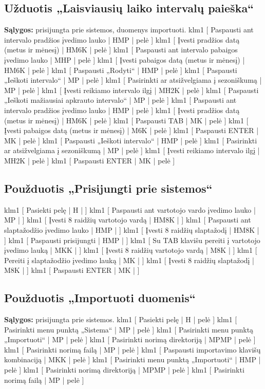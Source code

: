 \subsection{Užduotis „Laisviausių laiko intervalų paieška“}
\textbf{Sąlygos:} prisijungta prie sistemos, duomenys importuoti.
\klm
{
  klm1 [ Paspausti ant intervalo pradžios įvedimo lauko | HMP | pelė ]
  klm1 [ Įvesti pradžios datą (metus ir mėnesį) | HM6K | pelė ]
  klm1 [ Paspausti ant intervalo pabaigos įvedimo lauko | MHP | pelė ]
  klm1 [ Įvesti pabaigos datą (metus ir mėnesį) | HM6K | pelė ]
  klm1 [ Paspausti „Rodyti“ | HMP | pelė ]
  klm1 [ Paspausti „Ieškoti intervalo“ | MP | pelė ]
  klm1 [ Pasirinkti ar atsižvelgiama į sezoniškumą | MP | pelė ]
  klm1 [ Įvesti reikiamo intervalo ilgį | MH2K | pelė ]
  klm1 [ Paspausti „Ieškoti mažiausiai apkrauto intervalo“ | MP | pelė ]
}
{
  klm1 [ Paspausti ant intervalo pradžios įvedimo lauko | HMP | pelė ]
  klm1 [ Įvesti pradžios datą (metus ir mėnesį) | HM6K | pelė ]
  klm1 [ Paspausti TAB | MK | pelė ]
  klm1 [ Įvesti pabaigos datą (metus ir mėnesį) | M6K | pelė ]
  klm1 [ Paspausti ENTER | MK | pelė ]
  klm1 [ Paspausti „Ieškoti intervalo“ | HMP | pelė ]
  klm1 [ Pasirinkti ar atsižvelgiama į sezoniškumą | MP | pelė ]
  klm1 [ Įvesti reikiamo intervalo ilgį | MH2K | pelė ]
  klm1 [ Paspausti ENTER | MK | pelė ]
}

\subsection{Použduotis „Prisijungti prie sistemos“}
\klm
{
  klm1 [ Pasiekti pelę | H | ]
  klm1 [ Paspausti ant vartotojo vardo įvedimo lauko | MP | ]
  klm1 [ Įvesti 8 raidžių vartotojo vardą | HM8K | ]
  klm1 [ Paspausti ant slaptažodžio įvedimo lauko | HMP | ]
  klm1 [ Įvesti 8 raidžių slaptažodį | HM8K | ]
  klm1 [ Paspausti prisijungti | HMP | ]
}
{
  klm1 [ Su TAB klavišu pereiti į vartotojo įvedimo lauką | MKK | ]
  klm1 [ Įvesti 8 raidžių vartotojo vardą | M8K | ]
  klm1 [ Pereiti į slaptažodžio įvedimo lauką | MK | ]
  klm1 [ Įvesti 8 raidžių slaptažodį | M8K | ]
  klm1 [ Paspausti ENTER | MK | ]
}

\subsection{Použduotis „Importuoti duomenis“}
\textbf{Sąlygos:} prisijungta prie sistemos.
\klm
{
  klm1 [ Pasiekti pelę | H | pelė ]
  klm1 [ Pasirinkti menu punktą „Sistema“ | MP | pelė ]
  klm1 [ Pasirinkti menu punktą „Importuoti“ | MP | pelė ]
  klm1 [ Pasirinkti norimą direktoriją | MPMP | pelė ]
  klm1 [ Pasirinkti norimą failą | MP | pelė ]
}
{
  klm1 [ Paspausti importavimo klavišų kombinaciją | MKK | pelė ]
  klm1 [ Pasirinkti menu punktą „Importuoti“ | HMP | pelė ]
  klm1 [ Pasirinkti norimą direktoriją | MPMP | pelė ]
  klm1 [ Pasirinkti norimą failą | MP | pelė ]
}

